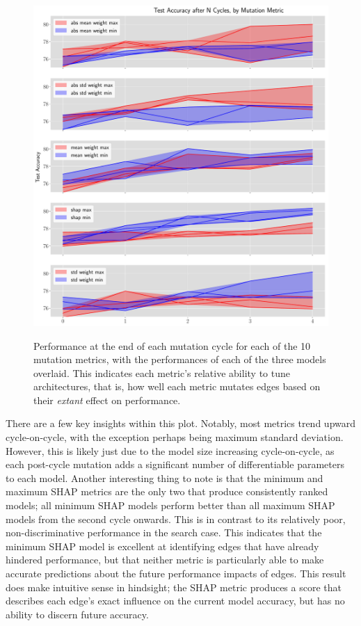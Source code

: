 \begin{figure}[ht!]
    \centering
	\includegraphics[width=\textwidth]{accuracy_after_n_cycles} \\
	\caption[Performance at the end of each mutation cycle for each of the 10 mutation metrics]{Performance at the end of each mutation cycle for each of the 10 mutation metrics, with the performances
    of each of the three models overlaid. This indicates each metric's relative ability to tune architectures, that is,
    how well each metric mutates edges based on their \textit{extant} effect on performance.}
	\label{fig:mutation_metrics_cycles}
\end{figure}

There are a few key insights within this plot. Notably, most metrics trend upward cycle-on-cycle, with the exception
perhaps being maximum standard deviation. However, this is likely just due to the model size increasing cycle-on-cycle,
as each post-cycle mutation adds a significant number of differentiable parameters to each model. Another interesting
thing to note is that the minimum and maximum SHAP metrics are the only two that produce consistently ranked models;
all minimum SHAP models perform better than all maximum SHAP models from the second cycle onwards. This is in contrast
to its relatively poor, non-discriminative performance in the search case. This indicates that the minimum SHAP model
is excellent at identifying edges that have already hindered performance, but that neither metric is particularly
able to make accurate predictions about the future performance impacts of edges. This result does make intuitive sense
in hindsight; the SHAP metric produces a score that describes each edge's exact influence on the current model accuracy,
but has no ability to discern future accuracy.

